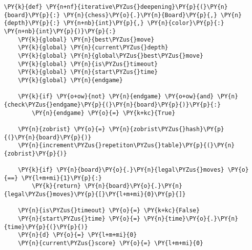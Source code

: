     \begin{tcolorbox}[fontupper=\linespread{.66}\selectfont, breakable, size=fbox, boxrule=1pt, pad at break*=1mm,colback=cellbackground, colframe=cellborder]
\begin{Verbatim}[commandchars=\\\{\}]
\PY{k}{def} \PY{n+nf}{iterative\PYZus{}deepening}\PY{p}{(}\PY{n}{board}\PY{p}{:} \PY{n}{chess}\PY{o}{.}\PY{n}{Board}\PY{p}{,} \PY{n}{depth}\PY{p}{:} \PY{n+nb}{int}\PY{p}{,} \PY{n}{color}\PY{p}{:} \PY{n+nb}{int}\PY{p}{)}\PY{p}{:}
    \PY{k}{global} \PY{n}{best\PYZus{}move}
    \PY{k}{global} \PY{n}{current\PYZus{}depth}
    \PY{k}{global} \PY{n}{global\PYZus{}best\PYZus{}move}
    \PY{k}{global} \PY{n}{is\PYZus{}timeout}
    \PY{k}{global} \PY{n}{start\PYZus{}time}
    \PY{k}{global} \PY{n}{endgame}

    \PY{k}{if} \PY{o+ow}{not} \PY{n}{endgame} \PY{o+ow}{and} \PY{n}{check\PYZus{}endgame}\PY{p}{(}\PY{n}{board}\PY{p}{)}\PY{p}{:}
        \PY{n}{endgame} \PY{o}{=} \PY{k+kc}{True}

    \PY{n}{zobrist} \PY{o}{=} \PY{n}{zobrist\PYZus{}hash}\PY{p}{(}\PY{n}{board}\PY{p}{)}
    \PY{n}{increment\PYZus{}repetiton\PYZus{}table}\PY{p}{(}\PY{n}{zobrist}\PY{p}{)}
    
    \PY{k}{if} \PY{n}{board}\PY{o}{.}\PY{n}{legal\PYZus{}moves} \PY{o}{==} \PY{l+m+mi}{1}\PY{p}{:}
        \PY{k}{return} \PY{n}{board}\PY{o}{.}\PY{n}{legal\PYZus{}moves}\PY{p}{[}\PY{l+m+mi}{0}\PY{p}{]}

    \PY{n}{is\PYZus{}timeout} \PY{o}{=} \PY{k+kc}{False}
    \PY{n}{start\PYZus{}time} \PY{o}{=} \PY{n}{time}\PY{o}{.}\PY{n}{time}\PY{p}{(}\PY{p}{)}
    \PY{n}{d} \PY{o}{=} \PY{l+m+mi}{0}
    \PY{n}{current\PYZus{}score} \PY{o}{=} \PY{l+m+mi}{0}


\end{Verbatim}
\end{tcolorbox}
